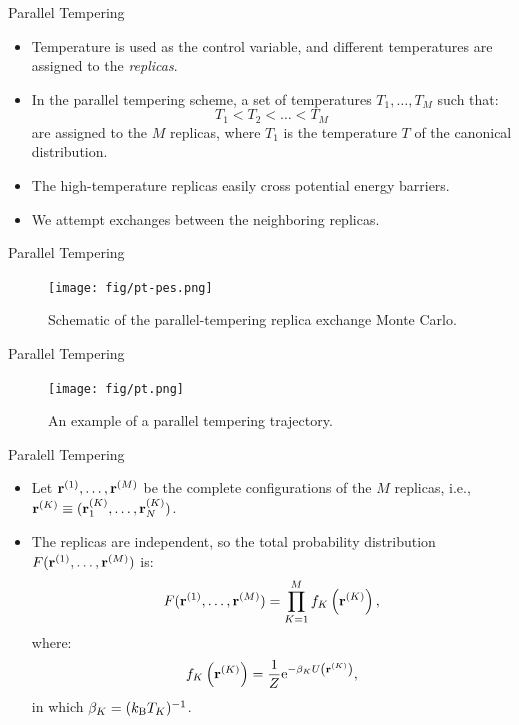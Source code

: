 \documentclass[10pt]{beamer}
\begin{document}
\begin{frame}{Parallel Tempering}
\begin{itemize}
\setlength\itemsep{1em}
  \item Temperature is used as the control variable, and different temperatures are assigned to the \textit{replicas}.

  \item In the parallel tempering scheme, a set of temperatures $T_1,\dots,T_M$ such that:
  \begin{equation}
    T_1 < T_2 < \dots < T_M
  \end{equation}
  are assigned to the $M$ replicas, where $T_1$ is the temperature $T$ of the canonical distribution.

  \item The high-temperature replicas easily cross potential energy barriers.

  \item We attempt exchanges between the neighboring replicas.
\end{itemize}
\end{frame}

\begin{frame}{Parallel Tempering}
\begin{figure}
  \texttt{[image: fig/pt-pes.png]}
  \caption{Schematic of the parallel-tempering replica exchange Monte Carlo.}
\end{figure}
\end{frame}

\begin{frame}{Parallel Tempering}
\begin{figure}
  \texttt{[image: fig/pt.png]}
  \caption{An example of a parallel tempering trajectory.}
\end{figure}
\end{frame}

\begin{frame}{Paralell Tempering}
\begin{itemize}
\setlength\itemsep{1em}
  \item Let ${\bf r}^{(1)}, \dots, {\bf r}^{(M)}$ be the complete configurations of the $M$ replicas, i.e., ${\bf r}^{(K)} \equiv ({\bf r}_1^{(K)}, \dots, {\bf r}_N^{(K)})$.

  \item The replicas are independent, so the total probability distribution $F({\bf r}^{(1)}, \dots, {\bf r}^{(M)})$ is:
  \begin{equation}
    F({\bf r}^{(1)}, \dots, {\bf r}^{(M)}) = \prod_{K=1}^{M} f_K\left( {\bf r}^{(K)} \right),
  \end{equation}
  where:
  \begin{equation}
    f_K\left( {\bf r}^{(K)} \right) = \frac{1}{Z} \mathrm{e}^{-\beta_K U\left( {\bf r}^{(K)} \right)},
  \end{equation}
  in which $\beta_K = (k_\mathrm{B}T_K)^{-1}$.
\end{itemize}
\end{frame}
\end{document}
